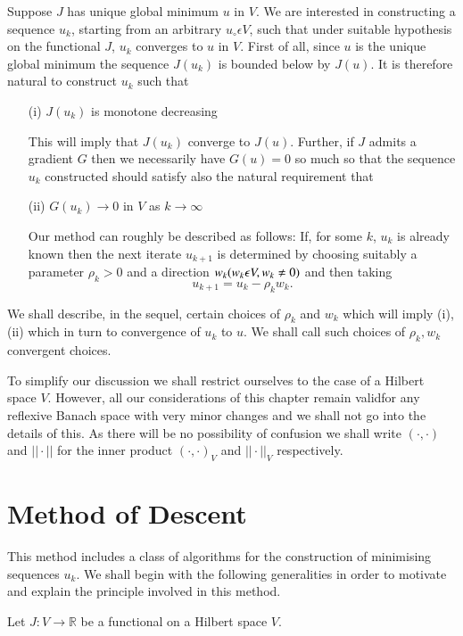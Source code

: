 Suppose $J$ has unique global minimum $u$ in $V$. We are interested in constructing a sequence $u_{k}$, starting from an arbitrary $u_{\circ} \epsilon V$, such that under suitable hypothesis on the functional $J$, $u_{k}$ converges to $u$ in $V$. First of all, since $u$ is the unique global minimum the sequence $J(u_{k})$ is bounded below by $J(u)$. It is therefore natural to construct $u_{k}$ such that
\begin{enumerate}
\item[(i)] $J(u_{k})$ is monotone decreasing

This will imply that $J(u_{k})$ converge to $J(u)$. Further, if $J$ admits a gradient $G$ then we necessarily have $G(u) = 0$ so much so that the sequence $u_{k}$ constructed should satisfy also the natural requirement that

\item[(ii)] $G(u_{k}) \to 0$ in $V$ as $k \to \infty$

Our method can roughly be described as follows: If, for some $k$, $u_{k}$ is already known then the next iterate $u_{k+1}$ is determined by choosing suitably a parameter $\rho_{k} > 0$ and a direction $w_{k}(w_{k} \epsilon V,\break w_{k} \neq 0)$ and then taking
$$
u_{k+1} = u_{k} - \rho_{k} w_{k}.
$$
\end{enumerate}

We shall describe, in the sequel, certain choices of $\rho_{k}$ and $w_{k}$ which will imply (i), (ii) which in turn to convergence of $u_{k}$ to $u$. We shall call such choices of $\rho_{k}, w_{k}$ convergent choices.

To simplify our discussion we shall restrict ourselves to the case of a Hilbert space $V$. However, all our considerations of this chapter remain valid\pageoriginale for any reflexive Banach space with very minor changes and we shall not go into the details of this. As there will be no possibility of confusion we shall write $(\cdot , \cdot)$ and $||\cdot||$ for the inner product $(\cdot , \cdot)_{V}$ and $||\cdot||_{V}$ respectively.

\section{Method of Descent}\label{chap3-sec1}
This method includes a class of algorithms for the construction of minimising sequences $u_{k}$. We shall begin with the following generalities in order to motivate and explain the principle involved in this method.

Let $J : V \to \mathbb{R}$ be a functional on a Hilbert space $V$.

